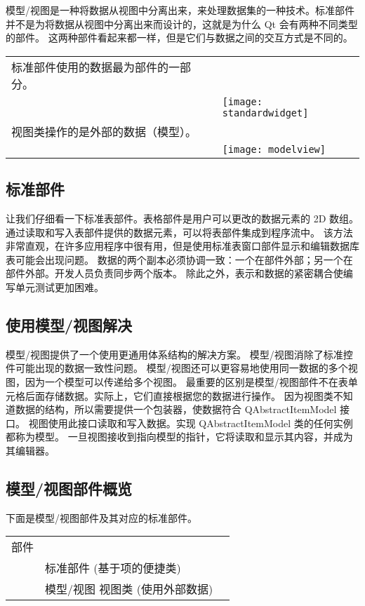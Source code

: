 模型/视图是一种将数据从视图中分离出来，来处理数据集的一种技术。标准部件并不是为将数据从视图中分离出来而设计的，这就是为什么 Qt 会有两种不同类型的部件。
这两种部件看起来都一样，但是它们与数据之间的交互方式是不同的。

\begin{tabular}{|l|m{25em}|}
\hline
标准部件使用的数据最为部件的一部分。\\
&
\texttt{[image: standardwidget]} \\ 
\hline	
视图类操作的是外部的数据（模型）。\\
&
\texttt{[image: modelview]} \\ 
\hline	
\end{tabular}

\subsection{标准部件}

让我们仔细看一下标准表部件。表格部件是用户可以更改的数据元素的 2D 数组。
通过读取和写入表部件提供的数据元素，可以将表部件集成到程序流中。
该方法非常直观，在许多应用程序中很有用，但是使用标准表窗口部件显示和编辑数据库表可能会出现问题。
数据的两个副本必须协调一致：一个在部件外部；另一个在部件外部。开发人员负责同步两个版本。
除此之外，表示和数据的紧密耦合使编写单元测试更加困难。

\subsection{使用模型/视图解决}

模型/视图提供了一个使用更通用体系结构的解决方案。
模型/视图消除了标准控件可能出现的数据一致性问题。
模型/视图还可以更容易地使用同一数据的多个视图，因为一个模型可以传递给多个视图。
最重要的区别是模型/视图部件不在表单元格后面存储数据。实际上，它们直接根据您的数据进行操作。
因为视图类不知道数据的结构，所以需要提供一个包装器，使数据符合 QAbstractItemModel 接口。
视图使用此接口读取和写入数据。实现 QAbstractItemModel 类的任何实例都称为模型。
一旦视图接收到指向模型的指针，它将读取和显示其内容，并成为其编辑器。

\subsection{模型/视图部件概览}

下面是模型/视图部件及其对应的标准部件。

\begin{tabular}{|l|l|l|}
\hline
部件\\ 
&
标准部件 (基于项的便捷类)\\ 
&
模型/视图 视图类 (使用外部数据)\\ 
\hline
\end{tabular}

